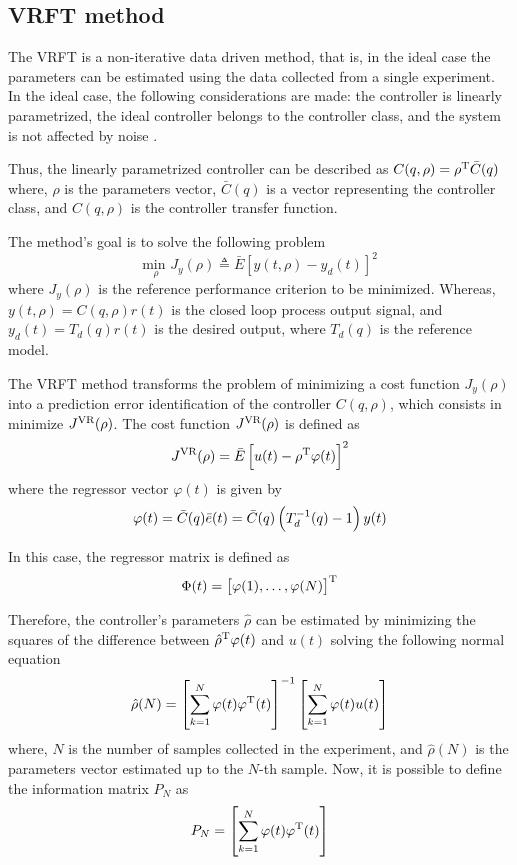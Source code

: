 \subsection{\label{sub:vrft} VRFT method}
The VRFT is a non-iterative data driven method, that is, in the ideal case the parameters can be estimated using the data collected from a single experiment.
In the ideal case, the following considerations are made: the controller is linearly parametrized, the ideal controller belongs to the controller class, and the system is not affected by noise \cite{bazanella2011data}.

Thus, the linearly parametrized controller can be described as $ C(q, \rho) = \rho^\text{T} \bar{C}(q)$
where, $\rho$ is the parameters vector, $\bar{C}(q)$ is a vector representing the controller class, and $C(q, \rho)$ is the controller transfer function.

The method's goal is to solve the following problem
\begin{equation}
	\underset{\rho}{\text{min }} J_y(\rho) \triangleq \bar{E} \left[ y(t, \rho) - y_d(t)  \right]^2
\label{eq:cost_jy}
\end{equation}
where $J_y(\rho)$ is the reference performance criterion to be minimized.
Whereas, $y(t, \rho) = C(q, \rho) r(t)$ is the closed loop process output signal, and $y_d(t) = T_d(q)r(t)$ is the desired output, where $T_d(q)$ is the reference model.

The VRFT method transforms the problem of minimizing a cost function $J_y(\rho)$ into a prediction error identification of the controller $C(q, \rho)$, which consists in minimize $J^\text{VR}(\rho)$.
The cost function $J^\text{VR}(\rho)$ is defined as
\[
	J^\text{VR}(\rho) = \bar{E} \left[ u(t) - \rho^\text{T} \varphi(t) \right]^2
\]
where the regressor vector $\varphi(t)$ is given by
\begin{equation}
	\varphi(t) = \bar{C}(q)\bar{e}(t) = \bar{C}(q) \left( T_d^{-1}(q) -1 \right)y(t)
\label{eq:reg_vector_vrft}
\end{equation}

In this case, the regressor matrix is defined as
\begin{equation}
	\Phi(t) = \left[ \varphi(1), \ldots, \varphi(N) \right]^\text{T}
\label{eq:reg_mat_vrft}
\end{equation}

Therefore, the controller's parameters $\hat{\rho}$ can be estimated by minimizing the squares of the difference between $\hat{\rho}^\text{T} \varphi(t)$ and $u(t)$ solving the following normal equation
\begin{equation}
	\hat{\rho}(N) = \left[ \sum \limits_{k=1}^N \varphi(t) \varphi^\text{T}(t) \right]^{-1} \left[\sum \limits_{k=1}^N \varphi(t) u(t) \right] \label{eq:rho_idealcase}
\end{equation}
where, $N$ is the number of samples collected in the experiment, and $\hat{\rho}(N)$ is the parameters vector estimated up to the $N$-th sample.
Now, it is possible to define the information matrix $P_N$ as
\begin{equation}
	P_N = \left[ \sum \limits_{k=1}^N \varphi(t) \varphi^\text{T}(t) \right]
\label{eq:inf_mat_vrft}
\end{equation}

